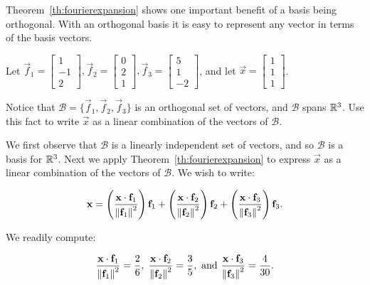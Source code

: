 \documentclass{ximera}
\begin{document}
Theorem~\ref{th:fourierexpansion} shows one important benefit of a basis being orthogonal.  With an orthogonal basis it is easy to represent any vector in terms of the basis vectors.  

\begin{example}\label{fourier}
Let
$\vec{f}_1= \begin{bmatrix}
1 \\ -1 \\ 2
\end{bmatrix},
\vec{f}_2= \begin{bmatrix}
0 \\ 2 \\ 1 
\end{bmatrix},
\vec{f}_3 =\begin{bmatrix}
5 \\ 1 \\ -2
\end{bmatrix}$,
and let
$\vec{x} =\begin{bmatrix}
1 \\ 1 \\ 1
\end{bmatrix}$.  

Notice that $\mathcal{B}=\{ \vec{f}_1, \vec{f}_2, \vec{f}_3\}$
is an orthogonal set of vectors, and $\mathcal{B}$ spans $\mathbb{R}^3$.  Use this fact to write $\vec{x}$ as  a linear combination of the vectors of $\mathcal{B}$.

\begin{explanation}
We first observe that $\mathcal{B}$ is a linearly independent set of vectors, and so $\mathcal{B}$ is a basis for $\mathbb{R}^3$. Next we apply Theorem~\ref{th:fourierexpansion} to express $\vec{x}$ as  a linear combination of the vectors of $\mathcal{B}$.  We wish to write:

\[
\mathbf{x}   =
\left(\frac{\mathbf{x}\cdot \mathbf{f}_1}{\left\lVert\mathbf{f}_1\right\rVert^2}\right) \mathbf{f}_1 +
\left(\frac{\mathbf{x}\cdot \mathbf{f}_2}{\left\lVert\mathbf{f}_2\right\rVert^2}\right) \mathbf{f}_2 +
\left(\frac{\mathbf{x}\cdot \mathbf{f}_3}{\left\lVert\mathbf{f}_3\right\rVert^2}\right) \mathbf{f}_3.
\]

We readily compute:

\[
\frac{\mathbf{x}\cdot\mathbf{f}_1}{\left\lVert\mathbf{f}_1\right\rVert^2} = \frac{2}{6}, \;
\frac{\mathbf{x}\cdot\mathbf{f}_2}{\left\lVert\mathbf{f}_2\right\rVert^2} = \frac{3}{5},
\mbox{ and }
\frac{\mathbf{x}\cdot\mathbf{f}_3}{\left\lVert\mathbf{f}_3\right\rVert^2} = \frac{4}{30}.\]


\end{explanation}
\end{example}
\end{document}
